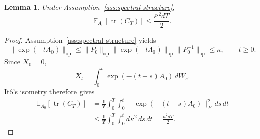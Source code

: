 \documentclass[11pt]{article}
\newtheorem{lemma}[theorem]{Lemma}
\begin{document}
\begin{lemma}%
\label{lem:spectral-trace-bound}
Under Assumption~\ref{ass:spectral-structure},
\begin{equation}
    \mathbb E_{A_0}\!\left[\operatorname{tr}(C_T)\right]
    \leq\frac{\overline\kappa^2dT}{2}.
\label{eq:spectral-trace-bound}
\end{equation}
\end{lemma}

\begin{proof}
Assumption~\ref{ass:spectral-structure} yields
\[
    \|\exp(-tA_0)\|_{\mathrm{op}}
    \leq
    \|P_0\|_{\mathrm{op}}
    \|\exp(-t\Lambda_0)\|_{\mathrm{op}}
    \|P_0^{-1}\|_{\mathrm{op}}
    \leq\overline\kappa,
    \qquad t\geq0.
\]
Since $X_0=0$,
\[
    X_t=\int_0^t \exp(-(t-s)A_0)\,dW_s.
\]
It\^o's isometry therefore gives
\begin{align*}
    \mathbb E_{A_0}\!\left[\operatorname{tr}(C_T)\right]
    &=\frac1T\int_0^T
      \int_0^t
      \|\exp(-(t-s)A_0)\|_F^2\,ds\,dt \\
    &\leq\frac1T\int_0^T\int_0^t
      d\overline\kappa^2\,ds\,dt
    =\frac{\overline\kappa^2dT}{2}.
\end{align*}
\end{proof}
\end{document}
